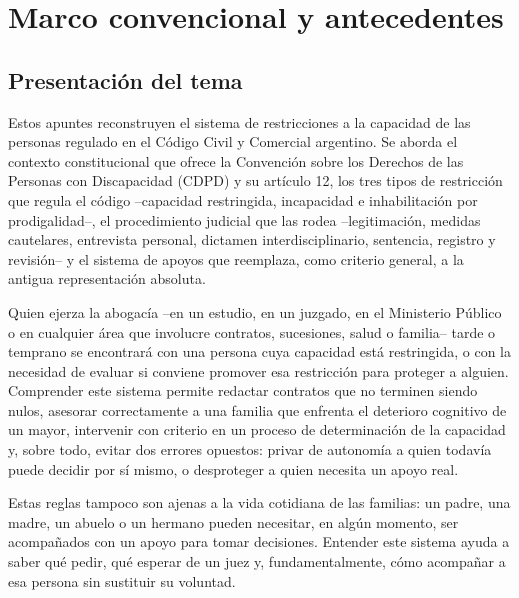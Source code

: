 \documentclass[12pt,oneside]{book}
\begin{document}
\tableofcontents

\chapter{Marco convencional y antecedentes}
\label{ch:bloque1}

\section{Presentación del tema}

Estos apuntes reconstruyen el sistema de restricciones a la capacidad de las personas regulado en el Código Civil y Comercial argentino. Se aborda el contexto constitucional que ofrece la Convención sobre los Derechos de las Personas con Discapacidad (CDPD) y su artículo 12, los tres tipos de restricción que regula el código --capacidad restringida, incapacidad e inhabilitación por prodigalidad--, el procedimiento judicial que las rodea --legitimación, medidas cautelares, entrevista personal, dictamen interdisciplinario, sentencia, registro y revisión-- y el sistema de apoyos que reemplaza, como criterio general, a la antigua representación absoluta.

Quien ejerza la abogacía --en un estudio, en un juzgado, en el Ministerio Público o en cualquier área que involucre contratos, sucesiones, salud o familia-- tarde o temprano se encontrará con una persona cuya capacidad está restringida, o con la necesidad de evaluar si conviene promover esa restricción para proteger a alguien. Comprender este sistema permite redactar contratos que no terminen siendo nulos, asesorar correctamente a una familia que enfrenta el deterioro cognitivo de un mayor, intervenir con criterio en un proceso de determinación de la capacidad y, sobre todo, evitar dos errores opuestos: privar de autonomía a quien todavía puede decidir por sí mismo, o desproteger a quien necesita un apoyo real.

Estas reglas tampoco son ajenas a la vida cotidiana de las familias: un padre, una madre, un abuelo o un hermano pueden necesitar, en algún momento, ser acompañados con un apoyo para tomar decisiones. Entender este sistema ayuda a saber qué pedir, qué esperar de un juez y, fundamentalmente, cómo acompañar a esa persona sin sustituir su voluntad.
\end{document}
